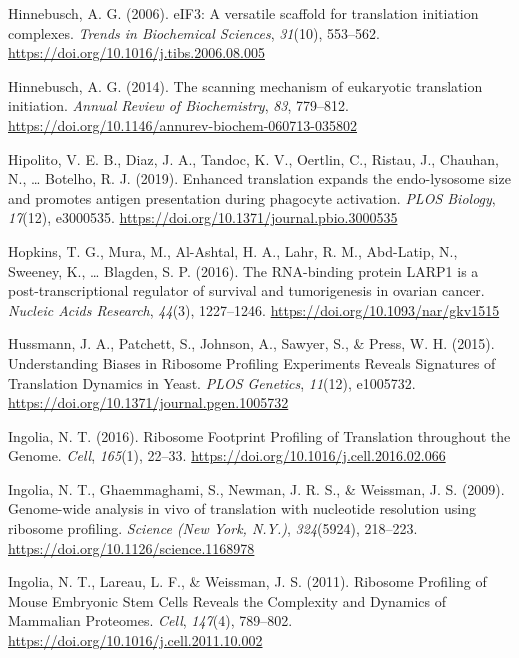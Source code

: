 \documentclass[12pt,openany]{book}
\begin{document}
\hypertarget{ref-Hinnebusch2006}{}
Hinnebusch, A. G. (2006). eIF3: A versatile scaffold for translation
initiation complexes. \emph{Trends in Biochemical Sciences},
\emph{31}(10), 553--562.
\url{https://doi.org/10.1016/j.tibs.2006.08.005}

\hypertarget{ref-Hinnebusch2014}{}
Hinnebusch, A. G. (2014). The scanning mechanism of eukaryotic
translation initiation. \emph{Annual Review of Biochemistry}, \emph{83},
779--812. \url{https://doi.org/10.1146/annurev-biochem-060713-035802}

\hypertarget{ref-Hipolito2019}{}
Hipolito, V. E. B., Diaz, J. A., Tandoc, K. V., Oertlin, C., Ristau, J.,
Chauhan, N., \ldots{} Botelho, R. J. (2019). Enhanced translation
expands the endo-lysosome size and promotes antigen presentation during
phagocyte activation. \emph{PLOS Biology}, \emph{17}(12), e3000535.
\url{https://doi.org/10.1371/journal.pbio.3000535}

\hypertarget{ref-Hopkins2016}{}
Hopkins, T. G., Mura, M., Al-Ashtal, H. A., Lahr, R. M., Abd-Latip, N.,
Sweeney, K., \ldots{} Blagden, S. P. (2016). The RNA-binding protein
LARP1 is a post-transcriptional regulator of survival and tumorigenesis
in ovarian cancer. \emph{Nucleic Acids Research}, \emph{44}(3),
1227--1246. \url{https://doi.org/10.1093/nar/gkv1515}

\hypertarget{ref-Hussmann2015}{}
Hussmann, J. A., Patchett, S., Johnson, A., Sawyer, S., \& Press, W. H.
(2015). Understanding Biases in Ribosome Profiling Experiments Reveals
Signatures of Translation Dynamics in Yeast. \emph{PLOS Genetics},
\emph{11}(12), e1005732.
\url{https://doi.org/10.1371/journal.pgen.1005732}

\hypertarget{ref-Ingolia2016}{}
Ingolia, N. T. (2016). Ribosome Footprint Profiling of Translation
throughout the Genome. \emph{Cell}, \emph{165}(1), 22--33.
\url{https://doi.org/10.1016/j.cell.2016.02.066}

\hypertarget{ref-Ingolia2009}{}
Ingolia, N. T., Ghaemmaghami, S., Newman, J. R. S., \& Weissman, J. S.
(2009). Genome-wide analysis in vivo of translation with nucleotide
resolution using ribosome profiling. \emph{Science (New York, N.Y.)},
\emph{324}(5924), 218--223.
\url{https://doi.org/10.1126/science.1168978}

\hypertarget{ref-Ingolia2011}{}
Ingolia, N. T., Lareau, L. F., \& Weissman, J. S. (2011). Ribosome
Profiling of Mouse Embryonic Stem Cells Reveals the Complexity and
Dynamics of Mammalian Proteomes. \emph{Cell}, \emph{147}(4), 789--802.
\url{https://doi.org/10.1016/j.cell.2011.10.002}
\end{document}
